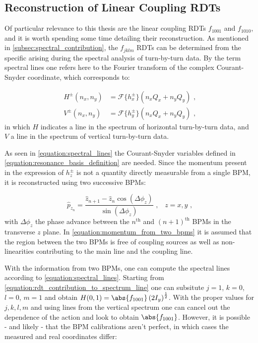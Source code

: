 \subsection{Reconstruction of Linear Coupling RDTs}
\label{subsection:reconstruction_linear_coupling_rdts}

Of particular relevance to this thesis are the linear coupling RDTs \(f_{1001}\) and \(f_{1010}\), and it is worth spending some time detailing their reconstruction.
As mentioned in \cref{subsec:spectral_contribution}, the \(f_{jklm}\) RDTs can be determined from the specific  arising during the spectral analysis of turn-by-turn data.
By the term spectral lines one refers here to the Fourier transform of the complex Courant-Snyder coordinate, which corresponds to:

\begin{equation}
  \begin{aligned}
    H^\pm(n_x, n_y) &= \mathcal{F}\{h_x^\pm\}(n_x Q_x + n_y Q_y)  \text{ ,}  \\
    V^\pm(n_x, n_y) &= \mathcal{F}\{h_y^\pm\}(n_x Q_x + n_y Q_y)  \text{ ,}
  \end{aligned}
  \label{equation:spectral_lines}
\end{equation}
in which \(H\) indicates a line in the spectrum of horizontal turn-by-turn data, and \(V\) a line in the spectrum of vertical turn-by-turn data.

As seen in \cref{equation:spectral_lines} the Courant-Snyder variables defined in \cref{equation:resonance_basis_definition} are needed.
Since the momentum present in the expression of \(h_z^\pm\) is not a quantity directly measurable from a single BPM, it is reconstructed using two successive BPMs:

\begin{equation}
  \hat{p}_{z_n} = \frac{\hat{z}_{n+1} - \hat{z}_n \cos \left(\Delta \phi_z\right)}{\sin \left(\Delta \phi_z\right)}  \text{ ,} \quad z = x, y \text{ ,}
  \label{equation:momentum_from_two_bpms}
\end{equation}
with \(\Delta \phi_z\) the phase advance between the \(n^{\mathrm{th}}\) and \((n+1)^{\mathrm{th}}\) BPMs in the transverse \(z\) plane.
In \cref{equation:momentum_from_two_bpms} it is assumed that the region between the two BPMs is free of coupling sources as well as non-linearities contributing to the main line and the coupling line.

With the information from two BPMs, one can compute the spectral lines according to \cref{equation:spectral_lines}.
Starting from \cref{equation:rdt_contribution_to_spectrum_line} one can subsitute \(j = 1\), \(k = 0\), \(l = 0\), \(m = 1\) and obtain \(H(0, 1) = \abs{f_{1001}} \left(2 I_y \right)^{\frac{1}{2}}\).
With the proper values for \(j,k,l,m\) and using lines from the vertical spectrum one can cancel out the dependence of the action and look to obtain \(\abs{f_{1001}}\).
However, it is possible - and likely - that the BPM calibrations aren't perfect, in which cases the measured and real coordinates differ:

